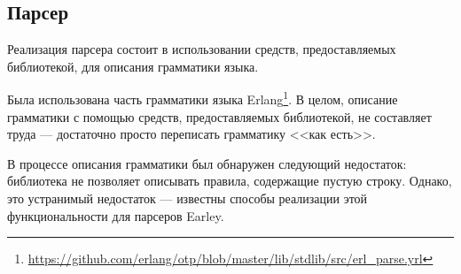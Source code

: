 \subsection{Парсер}

Реализация парсера состоит в использовании средств, предоставляемых библиотекой, для описания грамматики языка.

Была использована часть грамматики языка Erlang\footnote{\url{https://github.com/erlang/otp/blob/master/lib/stdlib/src/erl\_parse.yrl}}. В целом, описание грамматики с помощью средств, предоставляемых библиотекой, не составляет труда --- достаточно просто переписать грамматику <<как есть>>.


В процессе описания грамматики был обнаружен следующий недостаток: библиотека не позволяет описывать правила, содержащие пустую строку. Однако, это устранимый недостаток --- известны способы реализации этой функциональности для парсеров Earley\cite{emptyrules}.

